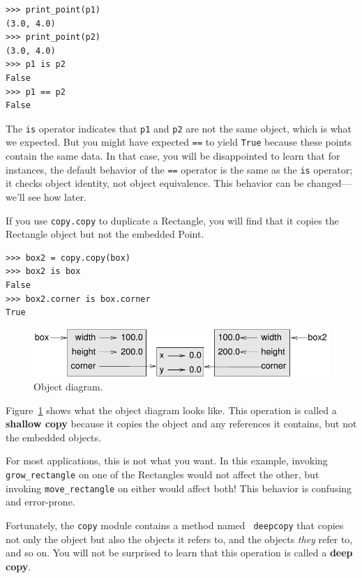 \documentclass[10pt]{book}
\begin{document}
\begin{CJK}{UTF8}{gbsn}
\begin{verbatim}
>>> print_point(p1)
(3.0, 4.0)
>>> print_point(p2)
(3.0, 4.0)
>>> p1 is p2
False
>>> p1 == p2
False
\end{verbatim}
%
The {\tt is} operator indicates that {\tt p1} and {\tt p2} are not the
same object, which is what we expected.  But you might have expected
{\tt ==} to yield {\tt True} because these points contain the same
data.  In that case, you will be disappointed to learn that for
instances, the default behavior of the {\tt ==} operator is the same
as the {\tt is} operator; it checks object identity, not object
equivalence.  This behavior can be changed---we'll see how later.

If you use {\tt copy.copy} to duplicate a Rectangle, you will find
that it copies the Rectangle object but not the embedded Point.

\begin{verbatim}
>>> box2 = copy.copy(box)
>>> box2 is box
False
>>> box2.corner is box.corner
True
\end{verbatim}

\begin{figure}
\centerline
{\includegraphics[scale=0.8]{figs/rectangle2.pdf}}
\caption{Object diagram.}
\label{fig.rectangle2}
\end{figure}

Figure~\ref{fig.rectangle2} shows what the object diagram looks like.
This operation is called a {\bf shallow copy} because it copies the
object and any references it contains, but not the embedded objects.

For most applications, this is not what you want.  In this example,
invoking \verb"grow_rectangle" on one of the Rectangles would not
affect the other, but invoking \verb"move_rectangle" on either would
affect both!  This behavior is confusing and error-prone.

Fortunately, the {\tt copy} module contains a method named {\tt
deepcopy} that copies not only the object but also 
the objects it refers to, and the objects {\em they} refer to,
and so on.
You will not be surprised to learn that this operation is
called a {\bf deep copy}.


\end{CJK}
\end{document}
